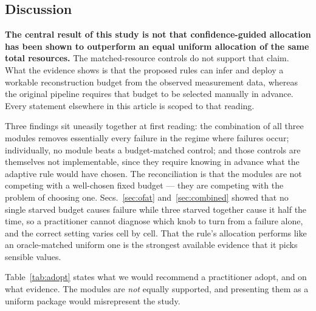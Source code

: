 \documentclass[preprint,11pt]{elsarticle}
\begin{document}
\subsection{Discussion}
\label{sec:discussion}

\textbf{The central result of this study is not that confidence-guided
allocation has been shown to outperform an equal uniform allocation of
the same total resources.} The matched-resource controls do not support
that claim. What the evidence shows is that the proposed rules can infer
and deploy a workable reconstruction budget from the observed measurement
data, whereas the original pipeline requires that budget to be selected
manually in advance. Every statement elsewhere in this article is scoped
to that reading.

Three findings sit uneasily together at first reading: the combination
of all three modules removes essentially every failure in the regime
where failures occur; individually, no module beats a budget-matched
control; and those controls are themselves not implementable, since they
require knowing in advance what the adaptive rule would have chosen. The
reconciliation is that the modules are not competing with a well-chosen
fixed budget --- they are competing with the problem of choosing one.
Secs.~\ref{sec:ofat} and~\ref{sec:combined} showed that no single starved
budget causes failure while three starved together cause it half the time, so a
practitioner cannot diagnose which knob to turn from a failure alone, and
the correct setting varies cell by cell. That the rule's allocation
performs like an oracle-matched uniform one is the strongest available
evidence that it picks sensible values.

Table~\ref{tab:adopt} states what we would recommend a practitioner
adopt, and on what evidence. The modules are \emph{not} equally
supported, and presenting them as a uniform package would misrepresent
the study.
\end{document}

